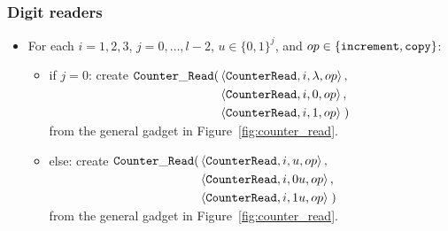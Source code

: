 \subsubsection{ Digit readers }

\begin{itemize}
\item For each $i = 1,2,3$,
               $j = 0,\ldots,l-2$,
               $u \in \{0, 1\}^j$, and
               $op \in \{{\tt increment}, {\tt copy} \}$:
    \begin{itemize}
        \item if $j = 0$:
        create
        $\begin{aligned}[t]
            {\tt Counter\_Read}(& \left\langle {\tt CounterRead}, i, \lambda, op \right\rangle, \\
                   & \left\langle {\tt CounterRead}, i, 0,      op \right\rangle, \\
                   & \left\langle {\tt CounterRead}, i, 1,      op \right\rangle \;)
        \end{aligned}$\\ from the general gadget in Figure~\ref{fig:counter_read}.

        \item else:
        create $\begin{aligned}[t]
        {\tt Counter\_Read}(& \left\langle {\tt CounterRead}, i, u,  op \right\rangle, \\
               & \left\langle {\tt CounterRead}, i, 0u, op \right\rangle, \\
               & \left\langle {\tt CounterRead}, i, 1u, op \right\rangle \;)
        \end{aligned}$\\ from the general gadget in Figure~\ref{fig:counter_read}.
    \end{itemize}

\end{itemize}

